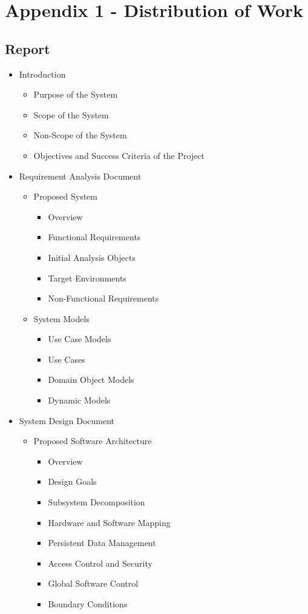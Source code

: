 \section{Appendix 1 - Distribution of Work}
\subsection{Report}
\begin{itemize}
	\item Introduction
	\begin{itemize}
		\item Purpose of the System
		\item Scope of the System
		\item Non-Scope of the System
		\item Objectives and Success Criteria of the Project 
	\end{itemize}
	\item Requirement Analysis Document
	\begin{itemize}
		\item Proposed System
		\begin{itemize}
			\item Overview
			\item Functional Requirements
			\item Initial Analysis Objects
			\item Target Environments
			\item Non-Functional Requirements			
		\end{itemize}

		\item System Models
		\begin{itemize}
			\item Use Case Models
			\item Use Cases
			\item Domain Object Models
			\item Dynamic Models
		\end{itemize}	
	\end{itemize}

	\item System Design Document
	\begin{itemize}
	\item Proposed Software Architecture
	\begin{itemize}
		\item Overview
		\item Design Goals
		\item Subsystem Decomposition
		\item Hardware and Software Mapping
		\item Persistent Data Management
		\item Access Control and Security
		\item Global Software Control
		\item Boundary Conditions
	\end{itemize}


\end{itemize}
\end{itemize}
